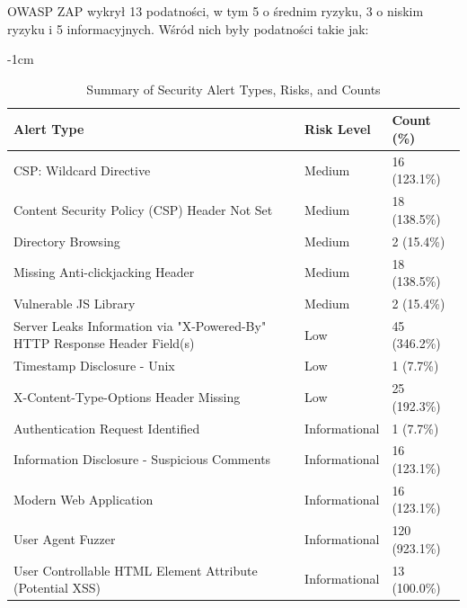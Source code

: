   OWASP ZAP wykrył 13 podatności, w tym 5 o średnim ryzyku, 3 o niskim ryzyku i 5 informacyjnych. Wśród nich były podatności takie jak:
  \begin{table}[H]
    \centering
    \caption{Summary of Security Alert Types, Risks, and Counts}
    \label{tab:security_alerts}
    \begin{adjustwidth}
    {-1cm}{}
    \footnotesize
    \begin{tabular}{|l|l|l|}
      \hline
      \textbf{Alert Type} & \textbf{Risk Level} & \textbf{Count (\%)} \\
      \hline
      CSP: Wildcard Directive & Medium & 16 (123.1\%) \\
      Content Security Policy (CSP) Header Not Set & Medium & 18 (138.5\%) \\
      Directory Browsing & Medium & 2 (15.4\%) \\
      Missing Anti-clickjacking Header & Medium & 18 (138.5\%) \\
      Vulnerable JS Library & Medium & 2 (15.4\%) \\
      Server Leaks Information via "X-Powered-By" HTTP Response Header Field(s) & Low & 45 (346.2\%) \\
      Timestamp Disclosure - Unix & Low & 1 (7.7\%) \\
      X-Content-Type-Options Header Missing & Low & 25 (192.3\%) \\
      Authentication Request Identified & Informational & 1 (7.7\%) \\
      Information Disclosure - Suspicious Comments & Informational & 16 (123.1\%) \\
      Modern Web Application & Informational & 16 (123.1\%) \\
      User Agent Fuzzer & Informational & 120 (923.1\%) \\
      User Controllable HTML Element Attribute (Potential XSS) & Informational & 13 (100.0\%) \\
      \hline
    \end{tabular}
  \end{adjustwidth}
    \end{table}

